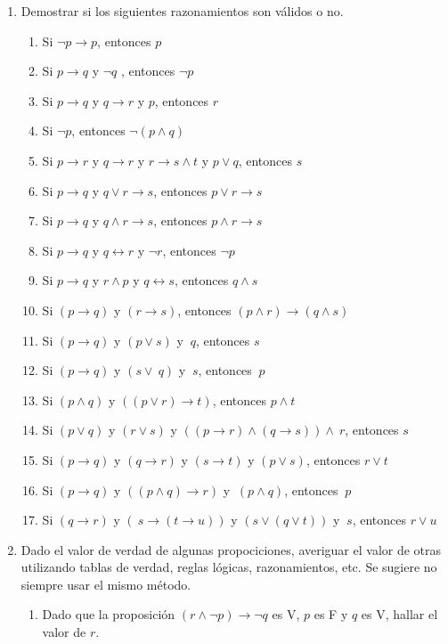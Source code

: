 \documentclass[a4paper]{article}
\newcommand{\exercise}{\item}
\newcommand{\then}{\to}
\newcommand{\eq}{\leftrightarrow}
\begin{document}
\begin{enumerate}
\begin{multicols}{2}
\begin{enumerate} [label=(\alph*)]
	\end{enumerate}
	\end{multicols}
	\exercise Demostrar si los siguientes razonamientos son válidos o no. 
	\begin{enumerate} [label=(\alph*)]
		\item Si $\neg p\then p$, entonces $p$
		\item Si $p\then q$ y $\neg q$ , entonces $\neg p$
		\item Si $p\then q$ y $q\then r$ y $p$, entonces $r$
		\item Si $\neg p$, entonces $\neg (p\land q)$
		\item Si $p\then r$ y $q\then r$ y $r\then s\land t$ y $p\lor q$, entonces $s$
		\item Si $p\then q$ y $q\lor r\then s$, entonces $p\lor r\then  s$
		\item Si $p\then q$ y $q\land r\then s$, entonces $p\land r\then  s$
		\item Si $p\then  q$  y $q\eq r$  y $\neg r$, entonces $\neg p$
		\item Si $p\then q$ y $r\land p$ y $q\eq s$, entonces $q\land s$
		\item Si $(p\then q)$ y $(r\then s)$, entonces $(p\land r)\then (q\land s)$ 
		\item Si $(p \then  q)$ y $(p \lor  s)$ y $~q$, entonces $s$
		\item Si $(p \then  q)$ y $(s \lor  ~q)$ y $~s$, entonces $~p$
		\item Si $(p \land  q)$ y $((p \lor  r) \then  t)$, entonces $p\land t$
		\item Si $(p \lor  q)$ y $(r \lor  s)$ y $((p \then  r) \land  (q \then  s)) \land  ~r$, entonces $s$
		\item Si $(p \then  q)$ y $(q \then  r)$ y $(s \then  t)$ y $(p \lor  s)$, entonces $r\lor t$
		\item Si $(p \then  q)$ y $((p \land  q) \then  r)$ y $~(p \land  q)$, entonces $~p$
		\item Si $(q \then  r)$ y $(~s \then  (t \then  u))$ y $(s \lor  (q \lor  t))$ y $~s$, entonces $r\lor u$
	\end{enumerate}
	\exercise Dado el valor de verdad de algunas propociciones, averiguar el valor de otras utilizando tablas de verdad, reglas lógicas, razonamientos, etc. Se sugiere no siempre usar el mismo método.
	\begin{enumerate} [label=(\alph*)]
		\item Dado que la proposición $(r\land \neg p)\then \neg q$ es V, $p$ es F y $q$ es V, hallar el valor de $r$. 

\end{enumerate}
\end{enumerate}
\end{document}
